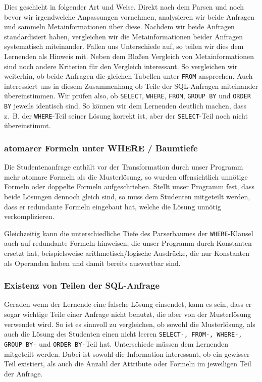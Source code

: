 Dies geschieht in folgender Art und Weise. Direkt nach dem Parsen und noch bevor wir irgendwelche Anpassungen vornehmen, analysieren wir beide Anfragen und sammeln Metainformationen über diese. Nachdem wir beide Anfragen standardisiert haben, vergleichen wir die Metainformationen beider Anfragen systematisch miteinander. Fallen uns Unterschiede auf, so teilen wir dies dem Lernenden als Hinweis mit. Neben dem Bloßen Vergleich von Metainformationen sind noch andere Kriterien für den Vergleich interessant. So vergleichen wir weiterhin, ob beide Anfragen die gleichen Tabellen unter \verb|FROM| ansprechen. Auch interessiert uns in diesem Zusammenhang ob Teile der SQL-Anfragen miteinander übereinstimmen. Wir prüfen also, ob \verb|SELECT|, \verb|WHERE|, \verb|FROM|, \verb|GROUP BY| und \verb|ORDER BY| jeweils identisch sind. So können wir dem Lernenden deutlich machen, dass \mbox{z. B.} der \verb|WHERE|-Teil seiner Lösung korrekt ist, aber der \verb|SELECT|-Teil noch nicht übereinstimmt.

\subsubsection*{atomarer Formeln unter WHERE / Baumtiefe}

Die Studentenanfrage enthält vor der Transformation durch unser Programm mehr atomare Formeln als die Musterlösung, so wurden offensichtlich unnötige Formeln oder doppelte Formeln aufgeschrieben. Stellt unser Programm fest, dass beide Lösungen dennoch gleich sind, so muss dem Studenten mitgeteilt werden, dass er redundante Formeln eingebaut hat, welche die Lösung unnötig verkomplizieren. 

Gleichzeitig kann die unterschiedliche Tiefe des Parserbaumes der \verb|WHERE|-Klausel auch auf redundante Formeln hinweisen, die unser Programm durch Konstanten ersetzt hat, beispielsweise arithmetisch/logische Ausdrücke, die nur Konstanten als Operanden haben und damit bereits auswertbar sind.

\subsubsection*{Existenz von Teilen der SQL-Anfrage}

Geraden wenn der Lernende eine falsche Lösung einsendet, kann es sein, dass er sogar wichtige Teile einer Anfrage nicht benutzt, die aber von der Musterlösung verwendet wird. So ist es sinnvoll zu vergleichen, ob sowohl die Musterlösung, als auch die Lösung des Studenten einen nicht leeren \verb|SELECT-, FROM-, WHERE-, GROUP BY-| und \verb|ORDER BY-|Teil hat. Unterschiede müssen dem Lernenden mitgeteilt werden. Dabei ist sowohl die Information interessant, ob ein gewisser Teil existiert, als auch die Anzahl der Attribute oder Formeln im jeweiligen Teil der Anfrage.

